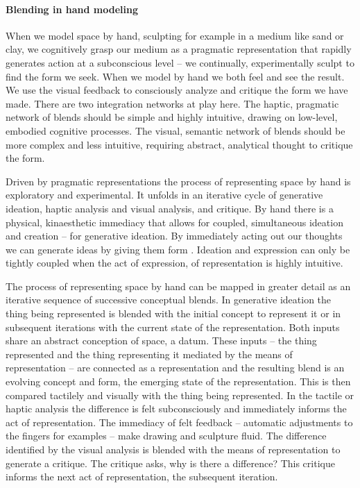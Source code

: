 \documentclass{article}
\begin{document}
\paragraph{Blending in hand modeling}
When we model space by hand, sculpting for example in a medium like sand or clay, 
we cognitively grasp our medium as a pragmatic representation that rapidly generates action at a subconscious level -- 
we continually, experimentally sculpt to find the form we seek. 
When we model by hand we both feel and see the result. 
We use the visual feedback to consciously analyze and critique the form we have made. 
There are two integration networks at play here. 
The haptic, pragmatic network of blends should be simple and highly intuitive, drawing on low-level, embodied cognitive processes. The visual, semantic network of blends should be more complex and less intuitive, requiring abstract, analytical thought to critique the form. 

Driven by pragmatic representations the process of representing space by hand is exploratory and experimental. It unfolds in an iterative cycle of generative ideation, haptic analysis and visual analysis, and critique. By hand there is a physical, kinaesthetic immediacy that allows for coupled, simultaneous ideation and creation --  for generative ideation. By immediately acting out our thoughts we can generate ideas by giving them form \citep{Ingold2011}. Ideation and expression can only be tightly coupled when the act of expression, of representation is highly intuitive. 

The process of representing space by hand can be mapped in greater detail as an iterative sequence of successive conceptual blends. 
In generative ideation the thing being represented is blended with the initial concept to represent it or in subsequent iterations with the current state of the representation. Both inputs share an abstract conception of space, a datum. These inputs -- the thing represented and the thing representing it mediated by the means of representation -- are connected as a representation and the resulting blend is an evolving concept and form, the emerging state of the representation. This is then compared tactilely and visually with the thing being represented. In the tactile or haptic analysis the difference is felt subconsciously and immediately informs the act of representation. The immediacy of felt feedback -- automatic adjustments to the fingers for examples -- make drawing and sculpture fluid. The difference identified by the visual analysis is blended with the means of representation to generate a critique. The critique asks, why is there a difference? This critique informs the next act of representation, the subsequent iteration.
\end{document}
